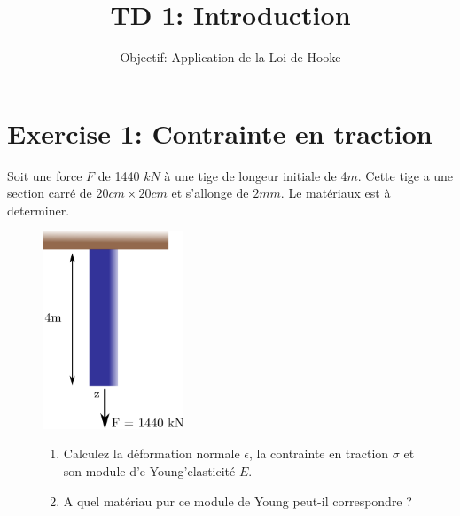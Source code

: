 \documentclass[
]{article}
\title{TD 1: Introduction}
\subtitle{Objectif: Application de la Loi de Hooke}
\author{}
\date{}
\begin{document}
\maketitle
\ifdefined\Shaded\renewenvironment{Shaded}{\begin{tcolorbox}[breakable, boxrule=0pt, interior hidden, borderline west={3pt}{0pt}{shadecolor}, sharp corners, enhanced, frame hidden]}{\end{tcolorbox}}\fi

\thispagestyle{fancy}

\hypertarget{exercise-1-contrainte-en-traction}{%
\section{Exercise 1: Contrainte en
traction}\label{exercise-1-contrainte-en-traction}}

Soit une force \(F\) de 1440 \(kN\) à une tige de longeur initiale de
4\(m\). Cette tige a une section carré de \(20cm \times 20cm\) et
s'allonge de \(2mm\). Le matériaux est à determiner.

\begin{figure}

\begin{minipage}[c]{0.40\linewidth}

{\centering 

\includegraphics[width=4.2cm,height=\textheight]{../assets/img/TD1/Ex1.png}

}

\end{minipage}%
%
\begin{minipage}[c]{0.60\linewidth}

{\centering 

\begin{enumerate}
\def\labelenumi{\arabic{enumi}.}
\item
  Calculez la déformation normale \(\epsilon\), la contrainte en
  traction \(\sigma\) et son module d'e Young'elasticité \(E\).
\item
  A quel matériau pur ce module de Young peut-il correspondre ?
\end{enumerate}

}

\end{minipage}%

\end{figure}
\end{document}
